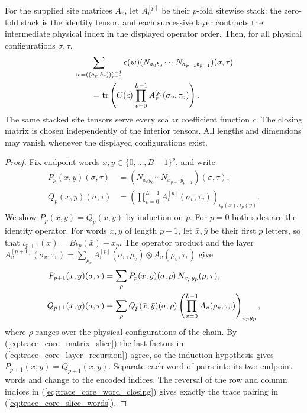 \begin{lemma}
    \label{thm:trace_core_slice_words}
    For the supplied site matrices $A_v$, let $A_v^{[p]}$ be their
    $p$-fold sitewise stack: the zero-fold stack is the identity tensor,
    and each successive layer contracts the intermediate physical index
    in the displayed operator order. Then, for all physical
    configurations $\sigma,\tau$,
    \begin{align}
         & \sum_{w=((a_r,b_r))_{r=0}^{p-1}}
        c(w)(N_{a_0b_0}\cdots N_{a_{p-1}b_{p-1}})(\sigma,\tau)\notag \\
         & \qquad=\operatorname{tr}\left(C(c)
        \prod_{v=0}^{L-1}A_v^{[p]}(\sigma_v,\tau_v)\right).
        \label{eq:trace_core_slice_words}
    \end{align}
    The same stacked site tensors serve every scalar coefficient function
    $c$. The closing matrix is chosen independently of the interior
    tensors. All lengths and dimensions may vanish whenever the displayed
    configurations exist.
\end{lemma}
\begin{proof}\leanok
    Fix endpoint words $x,y\in\{0,\ldots,B-1\}^{p}$, and write
    \begin{align*}
        P_p(x,y)(\sigma,\tau) & =(N_{x_0y_0}\cdots N_{x_{p-1}y_{p-1}})(\sigma,\tau), \\
        Q_p(x,y)(\sigma,\tau) & =\left(\prod_{v=0}^{L-1}A_v^{[p]}(\sigma_v,\tau_v)
        \right)_{\iota_p(x),\iota_p(y)}.
    \end{align*}
    We show $P_p(x,y)=Q_p(x,y)$ by induction on $p$. For $p=0$ both sides
    are the identity operator. For words $x,y$ of length $p+1$, let
    $\bar x,\bar y$ be their first $p$ letters, so that
    $\iota_{p+1}(x)=B\iota_p(\bar x)+x_p$. The operator product and the
    layer $A_v^{[p+1]}(\sigma_v,\tau_v)=\sum_{\rho_v}A_v^{[p]}(\sigma_v,\rho_v)
        \otimes A_v(\rho_v,\tau_v)$ give
    \begin{align}
        P_{p+1}(x,y)(\sigma,\tau)
         & =\sum_{\rho}P_p(\bar x,\bar y)(\sigma,\rho)\,
        N_{x_py_p}(\rho,\tau),\notag                     \\
        Q_{p+1}(x,y)(\sigma,\tau)
         & =\sum_{\rho}Q_p(\bar x,\bar y)(\sigma,\rho)
        \left(\prod_{v=0}^{L-1}A_v(\rho_v,\tau_v)\right)_{x_py_p},
        \label{eq:trace_core_layer_recursion}
    \end{align}
    where $\rho$ ranges over the physical configurations of the chain.
    By (\ref{eq:trace_core_matrix_slice}) the last factors in
    (\ref{eq:trace_core_layer_recursion}) agree, so the
    induction hypothesis gives $P_{p+1}(x,y)=Q_{p+1}(x,y)$. Separate each word of
    pairs into its two endpoint words and change to the encoded indices.
    The reversal of the row and column indices in
    (\ref{eq:trace_core_word_closing}) gives exactly the trace pairing in
    (\ref{eq:trace_core_slice_words}).
\end{proof}
